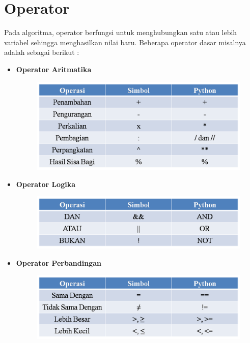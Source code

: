 
\section{Operator}
Pada algoritma, operator berfungsi untuk menghubungkan satu atau lebih variabel sehingga menghasilkan nilai baru. Beberapa operator dasar misalnya adalah sebagai berikut : 

\begin{itemize}

	\item \textbf{Operator Aritmatika}
	\begin{figure}[h!]
	\centering
	\includegraphics[scale=0.5]{fig/1/Gambar18.png}	
	\end{figure}	

	\item \textbf{Operator Logika}
	\begin{figure}[h!]
	\centering
	\includegraphics[scale=0.5]{fig/1/Gambar19.png}	
	\end{figure}	
	

	\item \textbf{Operator Perbandingan}
	\begin{figure}[h!]
	\centering
	\includegraphics[scale=0.5]{fig/1/Gambar20.png}	
	\end{figure}		
\end{itemize}


